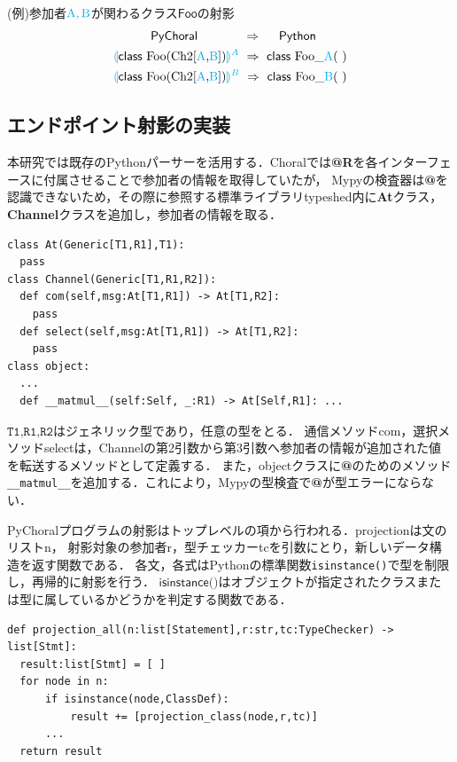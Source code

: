 \documentclass{resume}
\newcommand{\projection}[2]{{\color{cyan}\llparenthesis}#1{\color{cyan}\rrparenthesis^#2}}
\newcommand{\mblue}[1]{\textbf{\textsf{\color{MidnightBlue}#1}}}
\newcommand{\cyan}[1]{\color{cyan}#1}
\begin{document}
%
(例)参加者$\cyan{\text{A}},\cyan{\text{B}}$が関わるクラス$\textsf{Foo}$の射影
\begin{alignat*}{2} 
  &~~~~~~~~~\textsf{PyChoral} ~~~~~~~~~~~\Rightarrow~~~~ \textsf{Python}\\
  &\projection{\textsf{class} ~\text{Foo} \text{(Ch2[{\cyan{A}},{\cyan{B}}])}}{A} ~\Rightarrow~ \textsf{class} ~\text{Foo\_{\cyan{A}}}(~)\\
  &\projection{\textsf{class} ~\text{Foo} \text{(Ch2[{\cyan{A}},{\cyan{B}}])}}{B} ~\Rightarrow~ \textsf{class} ~\text{Foo\_{\cyan{B}}}(~)\\
\end{alignat*}
\vspace*{-20pt}
\subsection{エンドポイント射影の実装}
本研究では既存のPythonパーサーを活用する．Choralでは\mblue{@R}を各インターフェースに付属させることで参加者の情報を取得していたが，
Mypyの検査器は\mblue{@}を認識できないため，その際に参照する標準ライブラリ\textsf{typeshed}内に\textbf{At}クラス，
\textbf{Channel}クラスを追加し，参加者の情報を取る．
\begin{lstlisting}
class At(Generic[T1,R1],T1):
  pass
class Channel(Generic[T1,R1,R2]):
  def com(self,msg:At[T1,R1]) -> At[T1,R2]:
    pass
  def select(self,msg:At[T1,R1]) -> At[T1,R2]:
    pass
class object:
  ... 
  def __matmul__(self:Self, _:R1) -> At[Self,R1]: ...
\end{lstlisting}
$\texttt{T1,R1,R2}$はジェネリック型であり，任意の型をとる．
通信メソッド\textsf{com}，選択メソッド\textsf{select}は，Channelの第2引数から第3引数へ参加者の情報が追加された値を転送するメソッドとして定義する．
また，objectクラスに\mblue{@}のためのメソッド\texttt{\_\_matmul\_\_}を追加する．これにより，Mypyの型検査で\mblue{@}が型エラーにならない．

PyChoralプログラムの射影はトップレベルの項から行われる．\textsf{projection}は文のリスト\textsf{n}，
射影対象の参加者\textsf{r}，型チェッカー\textsf{tc}を引数にとり，新しいデータ構造を返す関数である．
各文，各式はPythonの標準関数\texttt{isinstance()}で型を制限し，再帰的に射影を行う．
$\textsf{isinstance()}$はオブジェクトが指定されたクラスまたは型に属しているかどうかを判定する関数である．
\begin{lstlisting}[caption=projection.py,label=data]
def projection_all(n:list[Statement],r:str,tc:TypeChecker) -> list[Stmt]:
  result:list[Stmt] = [ ]
  for node in n:
      if isinstance(node,ClassDef):
          result += [projection_class(node,r,tc)]
      ...
  return result
\end{lstlisting}
\end{document}
